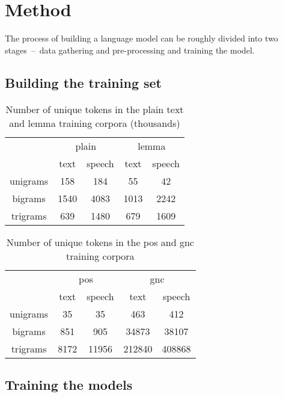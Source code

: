 \section{Method}
The process of building a language model can be roughly divided into two stages~--~data gathering and pre-processing and training the model.
\subsection{Building the training set}
\label{subsection:trainingset}

\begin{table}[!htbp]
	\centering
	\caption{Number of unique tokens in the plain text and lemma training corpora (thousands)}
	\begin{tabular}{*5c}
		{}        &  \multicolumn{2}{c}{plain} & \multicolumn{2}{c}{lemma}\\
		\cmidrule{2-5}
		{}        &  text & speech & text & speech \\
		unigrams  &  158  & 184    & 55   & 42    \\
	        bigrams   &  1540 & 4083   & 1013 & 2242   \\
                trigrams  &  639  & 1480   & 679  & 1609   \\
	\end{tabular}
\end{table}

\begin{table}[!htbp]
	\centering
	\caption{Number of unique tokens in the pos and gnc training corpora}
	\begin{tabular}{*5c}
		{}        &  \multicolumn{2}{c}{pos} & \multicolumn{2}{c}{gnc}\\
		\cmidrule{2-5}
		{}        &  text & speech & text    & speech \\
		unigrams  &  35   & 35     & 463     & 412    \\
	        bigrams   &  851  & 905    & 34873   & 38107  \\
                trigrams  &  8172 & 11956  & 212840  & 408868 \\
	\end{tabular}
\end{table}

\subsection{Training the models}
